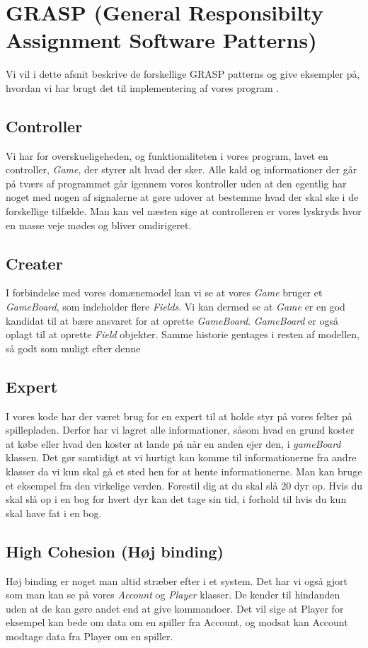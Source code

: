 \section{GRASP (General Responsibilty Assignment Software Patterns)}
Vi vil i dette afsnit beskrive de forskellige GRASP patterns og give eksempler på, hvordan vi har brugt det til implementering af vores program \cite{Larman}.
\subsection{Controller}
Vi har for overskueligeheden, og funktionaliteten i vores program, lavet en controller, \textit{Game}, der styrer alt hvad der sker. Alle kald og informationer der går på tværs af programmet går igennem vores kontroller uden at den egentlig har noget med nogen af signalerne at gøre udover at bestemme hvad der skal ske i de forskellige tilfælde. Man kan vel næsten sige at controlleren er vores lyskryds hvor en masse veje mødes og bliver omdirigeret.  
\subsection{Creater}
I forbindelse med vores domænemodel kan vi se at vores \textit{Game} bruger et \textit{GameBoard}, som indeholder flere \textit{Fields}. Vi kan dermed se at \textit{Game} er en god kandidat til at bære ansvaret for at oprette \textit{GameBoard}. \textit{GameBoard} er også oplagt til at oprette \textit{Field} objekter. Samme historie gentages i resten af modellen, så godt som muligt efter denne
\subsection{Expert}
I vores kode har der været brug for en expert til at holde styr på vores felter på spillepladen. Derfor har vi lagret alle informationer, såsom hvad en grund koster at købe eller hvad den koster at lande på når en anden ejer den, i \textit{gameBoard} klassen. Det gør samtidigt at vi hurtigt kan komme til informationerne fra andre klasser da vi kun skal gå et sted hen for at hente informationerne. 
Man kan bruge et eksempel fra den virkelige verden. Forestil dig at du skal slå 20 dyr op. Hvis du skal slå op i en bog for hvert dyr kan det tage sin tid, i forhold til hvis du kun skal have fat i en bog.
\\
\subsection{High Cohesion (Høj binding)}
Høj binding er noget man altid stræber efter i et system. Det har vi også gjort som man kan se på vores \textit{Account} og \textit{Player} klasser. De kender til hindanden uden at de kan gøre andet end at give kommandoer. Det vil sige at Player for eksempel kan bede om data om en spiller fra Account, og modsat kan Account modtage data fra Player om en spiller. 
